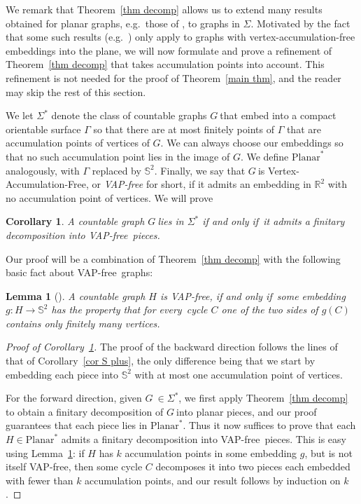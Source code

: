 \documentclass{article}
\newcommand{\pln}{\ensuremath{\mathrm{Planar}}}
\newcommand{\Sig}{\ensuremath{\Sigma}}
\newcommand{\vapf}{VAP-free}
\newcommand{\Pof}{Proof of }
\newcommand{\defi}[1]{{\color{darkgray}\emph{#1}}}
\newtheorem{corollary}[proposition]{Corollary}
\newtheorem{lemma}[proposition]{Lemma}
\newcommand{\R}{\ensuremath{\mathbb R}}
\newcommand{\BS}{\ensuremath{\mathbb S}}
\newcommand{\g}{\ensuremath{G\ }}
\newcommand{\G}{\ensuremath{G}}
\newcommand{\Lr}[1]{Lemma~\ref{#1}}
\newcommand{\Tr}[1]{Theorem~\ref{#1}}
\newcommand{\Cr}[1]{Corollary~\ref{#1}}
\renewcommand{\iff}{if and only if}
\newcommand{\fe}{for every}
\begin{document}
We remark that \Tr{thm decomp} allows us to extend many results obtained for planar graphs, e.g.\ those of \cite{intersection,planarPB,UKtrans}, to graphs in \Sig. Motivated by the fact that some such results (e.g.\ \cite{HuNaUni,kozPPP}) only apply to graphs with vertex-accumulation-free embeddings into the plane, we will now formulate and prove a refinement of \Tr{thm decomp} that takes accumulation points into account. This refinement is not needed for the proof of \Tr{main thm}, and the reader may skip the rest of this section.
\medskip

We let \defi{$\Sig^*$} denote the class of countable graphs \g that embed into a compact orientable surface $\Gamma$ so that there are at most finitely points of $\Gamma$ that are accumulation points of vertices of \G. We can always choose our embeddings so that no such accumulation point lies in the image of \G. We define \defi{$\pln^*$} analogously, with $\Gamma$ replaced by $\BS^2$. Finally, we  say that \g is Vertex-Accumulation-Free, or \defi{\vapf} for short, if it admits an embedding in $\R^2$ with no accumulation point of vertices. We will prove

\begin{corollary}\label{cor vapf}
A countable graph \g lies in $\Sig^*$ \iff\ it admits a finitary decomposition into \vapf\ pieces.
\end{corollary}

Our proof will be a combination of \Tr{thm decomp} with the following basic fact about \vapf\ graphs:
\begin{lemma}[{\cite[LEMMA~7.1]{thoPla}}] \label{lem vapf}
A countable graph $H$ is \vapf,  \iff\ some embedding $g: H\to \BS^2$ has the property that \fe\ cycle $C$ one of the two sides of $g(C)$ contains only finitely many vertices.
\end{lemma}


\begin{proof}[\Pof \Cr{cor vapf}]
The proof of the backward direction follows the lines of that of  \Cr{cor S plus}, the only difference being that we start by embedding each piece into $\BS^2$ with at most one accumulation point of vertices.

\medskip
For the forward direction, given $\g \in \Sig^*$, we first apply 
\Tr{thm decomp} to obtain a finitary decomposition of \g into planar pieces, and our proof guarantees that each piece lies in $\pln^*$. Thus it now suffices to prove that each $H\in \pln^*$ admits a finitary decomposition into \vapf\ pieces. This is easy using \Lr{lem vapf}: if $H$ has $k$ accumulation points in some embedding $g$, but is not itself \vapf, then some cycle $C$ decomposes it into two pieces each embedded with fewer than $k$ accumulation points, and our result follows by induction on $k$. 
\end{proof}
\end{document}

